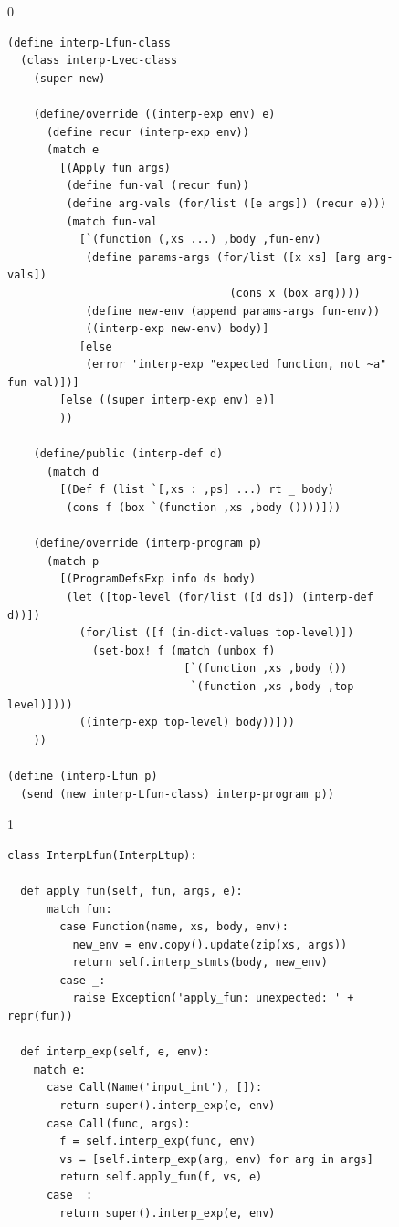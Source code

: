 \documentclass[7x10]{TimesAPriori_MIT}%
\def\racketEd{0}
\def\pythonEd{1}
\def\edition{1}
\newcommand{\pythonColor}[0]{}
\numberwithin{theorem}{chapter}
\numberwithin{definition}{chapter}
\numberwithin{equation}{chapter}
\begin{document}
\begin{figure}[tp]
  \begin{tcolorbox}[colback=white]
    {\if\edition\racketEd  
\begin{lstlisting}
(define interp-Lfun-class
  (class interp-Lvec-class
    (super-new)

    (define/override ((interp-exp env) e)
      (define recur (interp-exp env))
      (match e
        [(Apply fun args)
         (define fun-val (recur fun))
         (define arg-vals (for/list ([e args]) (recur e)))
         (match fun-val
           [`(function (,xs ...) ,body ,fun-env)
            (define params-args (for/list ([x xs] [arg arg-vals])
                                  (cons x (box arg))))
            (define new-env (append params-args fun-env))
            ((interp-exp new-env) body)]
           [else
            (error 'interp-exp "expected function, not ~a" fun-val)])]
        [else ((super interp-exp env) e)]
        ))

    (define/public (interp-def d)
      (match d
        [(Def f (list `[,xs : ,ps] ...) rt _ body)
         (cons f (box `(function ,xs ,body ())))]))

    (define/override (interp-program p)
      (match p
        [(ProgramDefsExp info ds body)
         (let ([top-level (for/list ([d ds]) (interp-def d))])
           (for/list ([f (in-dict-values top-level)])
             (set-box! f (match (unbox f)
                           [`(function ,xs ,body ())
                            `(function ,xs ,body ,top-level)])))
           ((interp-exp top-level) body))]))
    ))

(define (interp-Lfun p)
  (send (new interp-Lfun-class) interp-program p))
\end{lstlisting}
\fi}
{\if\edition\pythonEd\pythonColor
\begin{lstlisting}
class InterpLfun(InterpLtup):
  
  def apply_fun(self, fun, args, e):
      match fun:
        case Function(name, xs, body, env):
          new_env = env.copy().update(zip(xs, args))
          return self.interp_stmts(body, new_env)
        case _:
          raise Exception('apply_fun: unexpected: ' + repr(fun))
    
  def interp_exp(self, e, env):
    match e:
      case Call(Name('input_int'), []):
        return super().interp_exp(e, env)      
      case Call(func, args):
        f = self.interp_exp(func, env)
        vs = [self.interp_exp(arg, env) for arg in args]
        return self.apply_fun(f, vs, e)
      case _:
        return super().interp_exp(e, env)


\end{lstlisting}}
\end{tcolorbox}
\end{figure}
\end{document}
